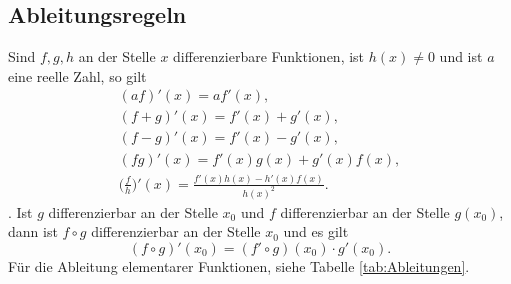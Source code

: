 \subsection{Ableitungsregeln}
Sind $f,g,h$ an der Stelle $x$ differenzierbare Funktionen,
ist $h(x)\ne 0$ und ist $a$ eine reelle Zahl, so gilt
\begin{gather}
(af)'(x) = af'(x),\\
(f+g)'(x) = f'(x)+g'(x),\\
(f-g)'(x) = f'(x)-g'(x),\\
(fg)'(x) = f'(x)g(x)+g'(x)f(x),\\
\Big(\frac{f}{h}\Big)'(x) = \frac{f'(x)h(x)-h'(x)f(x)}{h(x)^2}.
\end{gather}
.
Ist $g$ differenzierbar an der Stelle $x_0$ und
$f$ differenzierbar an der Stelle $g(x_0)$, dann ist $f\circ g$
differenzierbar an der Stelle $x_0$ und es gilt
\begin{equation}
(f\circ g)'(x_0) = (f'\circ g)(x_0)\cdot g'(x_0).
\end{equation}
Für die Ableitung elementarer Funktionen, siehe
Tabelle \ref{tab:Ableitungen}.

